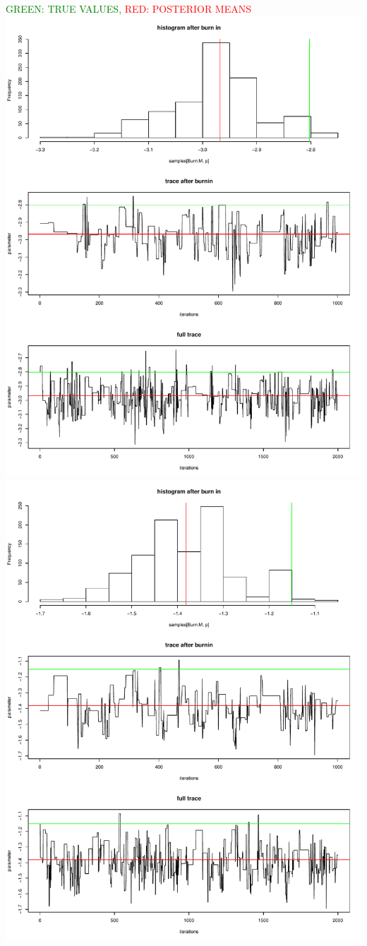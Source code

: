 \documentclass[a4paper,12pt]{scrartcl} %
\begin{document}
\textcolor{green}{GREEN: TRUE VALUES,} \textcolor{red}{ RED: POSTERIOR MEANS}
\clearpage
\includegraphics[scale=0.4]{1}  %
\includegraphics[scale=0.4]{2}
\end{document}
